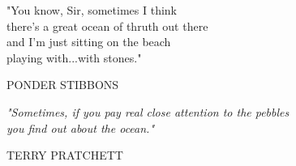 

\clearpage

\pagestyle{empty}
\null\vfill

\settowidth{}
\parbox{\longest}{%
  \raggedright{\large\itshape%
  
  \hspace{1cm}"You know, Sir, sometimes I think\\ 
  \hspace{1cm}there's a great ocean of thruth out there\\
  \hspace{1cm}and I'm just sitting on the beach\\
  \hspace{1cm}playing with...with stones."\\
  \par\bigskip
  }
  \hspace{8cm} \large\MakeUppercase{Ponder Stibbons}\par%
  \vspace{2cm}
  
  \raggedright{\large\itshape%
  \hspace{1cm}"Sometimes, if you pay real close attention to the pebbles \\ 
  \hspace{1cm}you find out about the ocean."\\ 
  \par\bigskip
  }   
  \vspace{1cm}
  \hspace{8cm} \large\MakeUppercase{Terry Pratchett}\par%
}
\vfill\vfill
\clearpage

